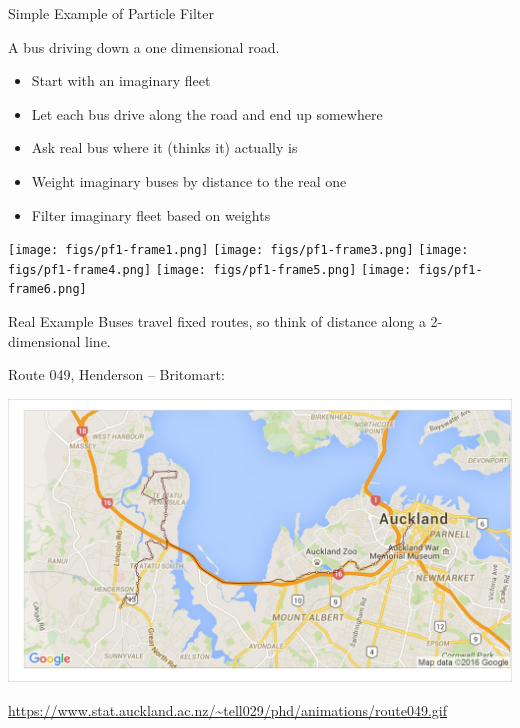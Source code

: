 \documentclass[10pt,t]{beamer}
\begin{document}
\begin{frame}{Simple Example of Particle Filter}

  A bus driving down a one dimensional road.
  \onslide<+->

  \begin{itemize}[<+- | alert@+>]
  \item Start with an imaginary fleet
  \item Let each bus drive along the road and end up somewhere
  \item Ask real bus where it (thinks it) actually is
  \item Weight imaginary buses by distance to the real one
  \item Filter imaginary fleet based on weights
  \end{itemize}
  
  \begin{overprint}
    \centering
    \texttt{[image: figs/pf1-frame1.png]}
    \centering
    \texttt{[image: figs/pf1-frame3.png]}
    \centering
    \texttt{[image: figs/pf1-frame4.png]}
    \centering
    \texttt{[image: figs/pf1-frame5.png]}
    \centering
    \texttt{[image: figs/pf1-frame6.png]}
  \end{overprint}

  \onslide<+->
\end{frame}


\begin{frame}{Real Example}
  Buses travel fixed routes, so think of distance along a 2-dimensional line.
  
  Route 049, Henderson -- Britomart:
  
  {\centering
  \includegraphics[width=\textwidth]{pf/particle_map001.jpg}}

  \footnotesize\url{https://www.stat.auckland.ac.nz/~tell029/phd/animations/route049.gif}
\end{frame}
\end{document}
